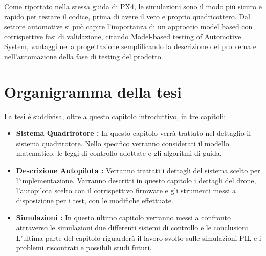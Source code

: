 Come riportato nella stessa guida di PX4, le simulazioni sono il modo più sicuro e rapido per testare il codice, prima di avere il vero e proprio quadricottero. Dal settore automotive si può capire l'importanza di un approccio model based con corrispettive fasi di validazione, citando Model-based testing of Automotive System, vantaggi nella progettazione semplificando la descrizione del problema e nell'automazione della fase di testing del prodotto. 



\section{Organigramma della tesi}
La tesi è suddivisa, oltre a questo capitolo introduttivo, in tre capitoli:
\begin{itemize}
	\item \textbf{Sistema Quadrirotore :} In questo capitolo verrà trattato nel dettaglio il sistema quadrirotore. Nello specifico verranno considerati il modello matematico, le leggi di controllo adottate e gli algoritmi di guida.
	\item \textbf{Descrizione Autopilota :} Verranno trattati i dettagli del sistema scelto per l'implementazione. Varranno descritti in questo capitolo i dettagli del drone, l'autopilota scelto con il corrispettivo firmware e gli strumenti messi a disposizione per i test, con le modifiche effettuate.
	\item \textbf{Simulazioni : } In questo ultimo capitolo verranno messi a confronto attraverso le simulazioni due differenti sistemi di controllo e le conclusioni. L'ultima parte del capitolo riguarderà il lavoro svolto sulle simulazioni PIL e i problemi riscontrati e possibili studi futuri.
\end{itemize}